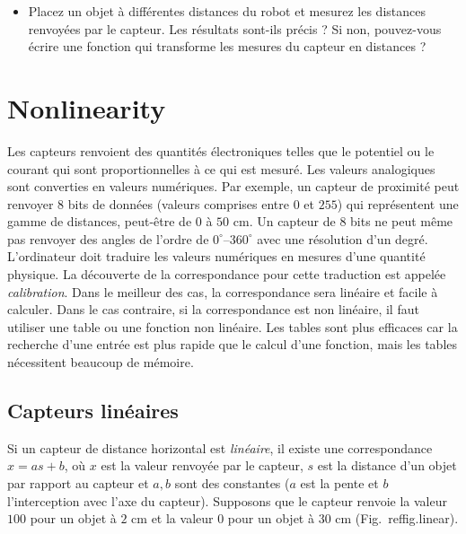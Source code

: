 \begin{framed}
\begin{itemize}
\item Placez un objet à différentes distances du robot et mesurez les distances renvoyées par le capteur. Les résultats sont-ils précis ? Si non, pouvez-vous écrire une fonction qui transforme les mesures du capteur en distances ?
\end{itemize}
\end{framed}

\section{Nonlinearity}\label{s.nonlinearity}

Les capteurs renvoient des quantités électroniques telles que le potentiel ou le courant qui sont proportionnelles à ce qui est mesuré. Les valeurs analogiques sont converties en valeurs numériques. Par exemple, un capteur de proximité peut renvoyer $8$ bits de données (valeurs comprises entre $0$ et $255$) qui représentent une gamme de distances, peut-être de $0$ à $50$ cm. Un capteur de $8$ bits ne peut même pas renvoyer des angles de l'ordre de $0^\circ$--$360^\circ$ avec une résolution d'un degré. L'ordinateur doit traduire les valeurs numériques en mesures d'une quantité physique. La découverte de la correspondance pour cette traduction est appelée \emph{calibration}. Dans le meilleur des cas, la correspondance sera linéaire et facile à calculer. Dans le cas contraire, si la correspondance est non linéaire, il faut utiliser une table ou une fonction non linéaire. Les tables sont plus efficaces car la recherche d'une entrée est plus rapide que le calcul d'une fonction, mais les tables nécessitent beaucoup de mémoire.

\subsection{Capteurs linéaires}

Si un capteur de distance horizontal est \emph{linéaire}, il existe une correspondance $x = a s + b$, où $x$ est la valeur renvoyée par le capteur, $s$ est la distance d'un objet par rapport au capteur et $a,b$ sont des constantes ($a$ est la pente et $b$ l'interception avec l'axe du capteur). Supposons que le capteur renvoie la valeur $100$ pour un objet à $2$ cm et la valeur $0$ pour un objet à $30$ cm (Fig.~ref{fig.linear}).

